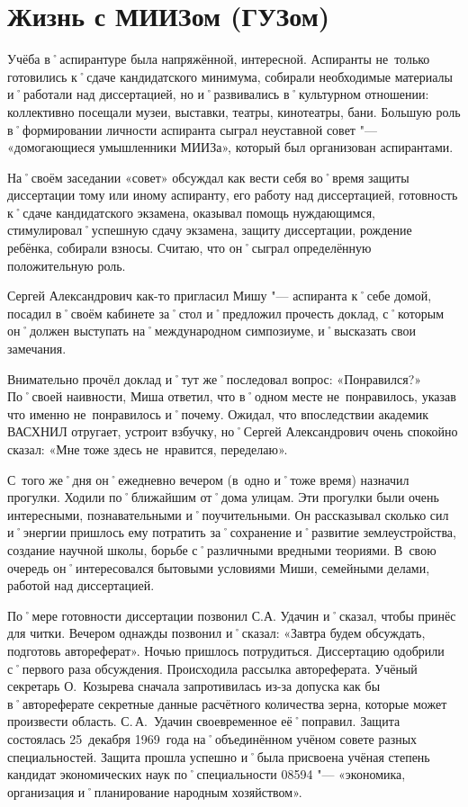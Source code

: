﻿\chapter{Жизнь с МИИЗом (ГУЗом)}

Учёба в˚аспирантуре была напряжённой, интересной. Аспиранты не~только готовились к˚сдаче кандидатского минимума, собирали необходимые материалы и˚работали над диссертацией, но и˚развивались в˚культурном отношении: коллективно посещали музеи, выставки, театры, кинотеатры, бани. Большую роль в˚формировании личности аспиранта сыграл неуставной совет "--- «домогающиеся умышленники МИИЗа», который был организован аспирантами. 

На˚своём заседании «совет» обсуждал как вести себя во˚время защиты диссертации тому или иному аспиранту, его работу над диссертацией, готовность к˚сдаче кандидатского экзамена, оказывал помощь нуждающимся, стимулировал˚успешную сдачу экзамена, защиту диссертации, рождение ребёнка, собирали взносы. Считаю, что он˚сыграл определённую положительную роль.

Сергей Александрович как-то пригласил Мишу "--- аспиранта к˚себе домой, посадил в˚своём кабинете за˚стол и˚предложил прочесть доклад, с˚которым он˚должен выступать на˚международном симпозиуме, и˚высказать свои замечания.

Внимательно прочёл доклад и˚тут же˚последовал вопрос: «Понравился?» По˚своей наивности, Миша ответил, что в˚одном месте не~понравилось, указав что именно не~понравилось и˚почему. Ожидал, что впоследствии академик ВАСХНИЛ отругает, устроит взбучку, но˚Сергей Александрович очень спокойно сказал: «Мне тоже здесь не~нравится, переделаю».

С~того же˚дня он˚ежедневно вечером (в~одно и˚тоже время) назначил прогулки. Ходили по˚ближайшим от˚дома улицам. Эти прогулки были очень интересными, познавательными и˚поучительными. Он рассказывал сколько сил и˚энергии пришлось ему потратить за˚сохранение и˚развитие землеустройства, создание научной школы, борьбе с˚различными вредными теориями. В~свою очередь он˚интересовался бытовыми условиями Миши, семейными делами, работой над диссертацией.

По˚мере готовности диссертации позвонил С.А. Удачин и˚сказал, чтобы принёс для читки. Вечером однажды позвонил и˚сказал: «Завтра будем обсуждать, подготовь автореферат». Ночью пришлось потрудиться. Диссертацию одобрили с˚первого раза обсуждения. Происходила рассылка автореферата. Учёный секретарь О.~Козырева сначала запротивилась из-за допуска как бы в˚автореферате секретные данные расчётного количества зерна, которые может произвести область. С.\,А.~Удачин своевременное её˚поправил. Защита состоялась 25~декабря 1969~года на˚объединённом учёном совете разных специальностей. Защита прошла успешно и˚была присвоена учёная степень кандидат экономических наук по˚специальности 08594 "--- «экономика, организация и˚планирование народным хозяйством». 

